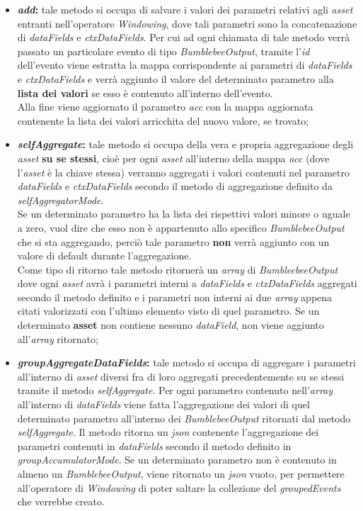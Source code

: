 \begin{itemize}
	\item{\textbf{\textit{add}:} tale metodo si occupa di salvare i valori dei parametri relativi agli \textit{asset} entranti nell'operatore \textit{Windowing}, dove tali parametri sono la concatenazione di \textit{dataFields} e \textit{ctxDataFields}. Per cui ad ogni chiamata di tale metodo verrà passato un particolare evento di tipo \textit{BumblebeeOutput}, tramite l'\textit{id} dell'evento viene estratta la mappa corrispondente ai parametri di \textit{dataFields} e \textit{ctxDataFields} e verrà aggiunto il valore del determinato parametro alla \textbf{lista dei valori} se esso è contenuto all'interno dell'evento.\\
Alla fine viene aggiornato il parametro \textit{acc} con la mappa aggiornata contenente la lista dei valori arricchita del nuovo valore, se trovato;}
	\item{\textbf{\textit{selfAggregate}:} tale metodo si occupa della vera e propria aggregazione degli \textit{asset} \textbf{su se stessi}, cioè per ogni \textit{asset} all'interno della mappa \textit{acc} (dove l'\textit{asset} è la chiave stessa) verranno aggregati i valori contenuti nel parametro \textit{dataFields} e \textit{ctxDataFields} secondo il metodo di aggregazione definito da \textit{selfAggregatorMode}.\\
	Se un determinato parametro ha la lista dei rispettivi valori minore o uguale a zero, vuol dire che esso non è appartenuto allo specifico \textit{BumblebeeOutput} che si sta aggregando, perciò tale parametro \textbf{non} verrà aggiunto con un valore di default durante l'aggregazione.\\
	Come tipo di ritorno tale metodo ritornerà un \textit{array} di \textit{BumbleebeeOutput} dove ogni \textit{asset} avrà i parametri interni a \textit{dataFields} e \textit{ctxDataFields} aggregati secondo il metodo definito e i parametri non interni ai due \textit{array} appena citati valorizzati con l'ultimo elemento visto di quel parametro. Se un determinato \textbf{asset} non contiene nessuno \textit{dataField}, non viene aggiunto all'\textit{array} ritornato;}
	\item{\textbf{\textit{groupAggregateDataFields}:} tale metodo si occupa di aggregare i parametri all'interno di \textit{asset} diversi fra di loro aggregati precedentemente su se stessi tramite il metodo \textit{selfAggregate}. Per ogni parametro contenuto nell'\textit{array} all'interno di \textit{dataFields} viene fatta l'aggregazione dei valori di quel determinato parametro all'interno dei \textit{BumblebeeOutput} ritornati dal metodo \textit{selfAggregate}. Il metodo ritorna un \textit{\gls{json}} contenente l'aggregazione dei parametri contenuti in \textit{dataFields} secondo il metodo definito in \textit{groupAccumulatorMode}. Se un determinato parametro non è contenuto in almeno un \textit{BumblebeeOutput}, viene ritornato un \textit{\gls{json}} vuoto, per permettere all'operatore di \textit{Windowing} di poter saltare la collezione del \textit{groupedEvents} che verrebbe creato.}
\end{itemize}
  


